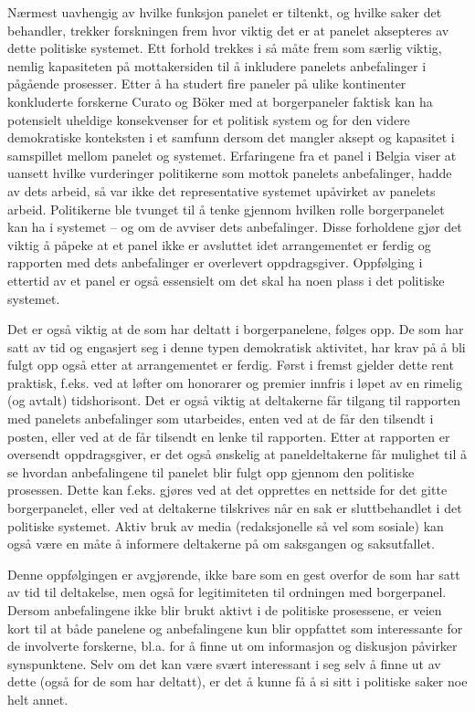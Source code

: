 \documentclass[
  12pt,
  a4paper, 12pt]{article}
\begin{document}
Nærmest uavhengig av hvilke funksjon panelet er tiltenkt, og hvilke saker det behandler, trekker forskningen frem hvor viktig det er at panelet aksepteres av dette politiske systemet. Ett forhold trekkes i så måte frem som særlig viktig, nemlig kapasiteten på mottakersiden til å inkludere panelets anbefalinger i pågående prosesser. Etter å ha studert fire paneler på ulike kontinenter konkluderte forskerne Curato og Böker med at borgerpaneler faktisk kan ha potensielt uheldige konsekvenser for et politisk system og for den videre demokratiske konteksten i et samfunn dersom det mangler aksept og kapasitet i samspillet mellom panelet og systemet. Erfaringene fra et panel i Belgia viser at uansett hvilke vurderinger politikerne som mottok panelets anbefalinger, hadde av dets arbeid, så var ikke det representative systemet upåvirket av panelets arbeid. Politikerne ble tvunget til å tenke gjennom hvilken rolle borgerpanelet kan ha i systemet -- og om de avviser dets anbefalinger. Disse forholdene gjør det viktig å påpeke at et panel ikke er avsluttet idet arrangementet er ferdig og rapporten med dets anbefalinger er overlevert oppdragsgiver. Oppfølging i ettertid av et panel er også essensielt om det skal ha noen plass i det politiske systemet.

Det er også viktig at de som har deltatt i borgerpanelene, følges opp. De som har satt av tid og engasjert seg i denne typen demokratisk aktivitet, har krav på å bli fulgt opp også etter at arrangementet er ferdig. Først i fremst gjelder dette rent praktisk, f.eks. ved at løfter om honorarer og premier innfris i løpet av en rimelig (og avtalt) tidshorisont. Det er også viktig at deltakerne får tilgang til rapporten med panelets anbefalinger som utarbeides, enten ved at de får den tilsendt i posten, eller ved at de får tilsendt en lenke til rapporten. Etter at rapporten er oversendt oppdragsgiver, er det også ønskelig at paneldeltakerne får mulighet til å se hvordan anbefalingene til panelet blir fulgt opp gjennom den politiske prosessen. Dette kan f.eks. gjøres ved at det opprettes en nettside for det gitte borgerpanelet, eller ved at deltakerne tilskrives når en sak er sluttbehandlet i det politiske systemet. Aktiv bruk av media (redaksjonelle så vel som sosiale) kan også være en måte å informere deltakerne på om saksgangen og saksutfallet.

Denne oppfølgingen er avgjørende, ikke bare som en gest overfor de som har satt av tid til deltakelse, men også for legitimiteten til ordningen med borgerpanel. Dersom anbefalingene ikke blir brukt aktivt i de politiske prosessene, er veien kort til at både panelene og anbefalingene kun blir oppfattet som interessante for de involverte forskerne, bl.a. for å finne ut om informasjon og diskusjon påvirker synspunktene. Selv om det kan være svært interessant i seg selv å finne ut av dette (også for de som har deltatt), er det å kunne få å si sitt i politiske saker noe helt annet.
\end{document}

